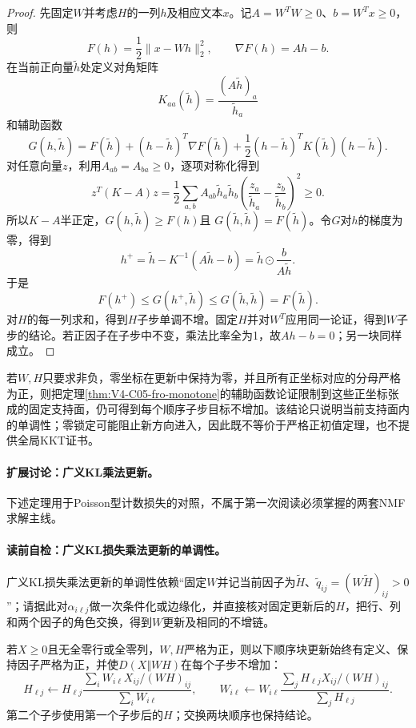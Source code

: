 \begin{proof}
先固定$W$并考虑$H$的一列$h$及相应文本$x$。记$A=W^TW\ge0$、$b=W^Tx\ge0$，则
\[
F(h)=\frac12\|x-Wh\|_2^2,
\qquad \nabla F(h)=Ah-b.
\]
在当前正向量$\widetilde h$处定义对角矩阵
\[
K_{aa}(\widetilde h)=\frac{(A\widetilde h)_a}{\widetilde h_a}
\]
和辅助函数
\[
G(h,\widetilde h)=F(\widetilde h)
+(h-\widetilde h)^T\nabla F(\widetilde h)
+\frac12(h-\widetilde h)^TK(\widetilde h)(h-\widetilde h).
\]
对任意向量$z$，利用$A_{ab}=A_{ba}\ge0$，逐项对称化得到
\[
z^T(K-A)z
=\frac12\sum_{a,b}A_{ab}\widetilde h_a\widetilde h_b
\left(\frac{z_a}{\widetilde h_a}-\frac{z_b}{\widetilde h_b}\right)^2\ge0.
\]
所以$K-A$半正定，$G(h,\widetilde h)\ge F(h)$且
$G(\widetilde h,\widetilde h)=F(\widetilde h)$。令$G$对$h$的梯度为零，得到
\[
h^+=\widetilde h-K^{-1}(A\widetilde h-b)
=\widetilde h\odot\frac{b}{A\widetilde h}.
\]
于是
\[
F(h^+)\le G(h^+,\widetilde h)
\le G(\widetilde h,\widetilde h)=F(\widetilde h).
\]
对$H$的每一列求和，得到$H$子步单调不增。固定$H$并对$W^T$应用同一论证，得到$W$子步的结论。若正因子在子步中不变，乘法比率全为1，故$Ah-b=0$；另一块同样成立。
\end{proof}

\begin{corollary}[固定支持面的边界版本]\label{cor:V4-C05-fro-fixed-face}
若$W,H$只要求非负，零坐标在更新中保持为零，并且所有正坐标对应的分母严格为正，则把定理\ref{thm:V4-C05-fro-monotone}的辅助函数论证限制到这些正坐标张成的固定支持面，仍可得到每个顺序子步目标不增加。该结论只说明当前支持面内的单调性；零锁定可能阻止新方向进入，因此既不等价于严格正初值定理，也不提供全局KKT证书。
\end{corollary}

\paragraph{扩展讨论：广义KL乘法更新。}
下述定理用于Poisson型计数损失的对照，不属于第一次阅读必须掌握的两套NMF求解主线。
\paragraph{读前自检：广义KL损失乘法更新的单调性。}广义KL损失乘法更新的单调性依赖“固定$W$并记当前因子为$\widetilde H$、$\widetilde q_{ij}=(W\widetilde H)_{ij}>0$”；请据此对$\alpha_{i\ell j}$做一次条件化或边缘化，并直接核对固定更新后的$H$，把行、列和两个因子的角色交换，得到$W$更新及相同的不增链。\par

\begin{theorem}[广义KL损失乘法更新的单调性]\label{thm:V4-C05-kl-monotone}
若$X\ge0$且无全零行或全零列，$W,H$严格为正，则以下顺序块更新始终有定义、保持因子严格为正，并使$D(X\Vert WH)$在每个子步不增加：
\[
H_{\ell j}\leftarrow H_{\ell j}
\frac{\sum_iW_{i\ell}X_{ij}/(WH)_{ij}}{\sum_iW_{i\ell}},
\qquad
W_{i\ell}\leftarrow W_{i\ell}
\frac{\sum_jH_{\ell j}X_{ij}/(WH)_{ij}}{\sum_jH_{\ell j}}.
\]
第二个子步使用第一个子步后的$H$；交换两块顺序也保持结论。
\end{theorem}
